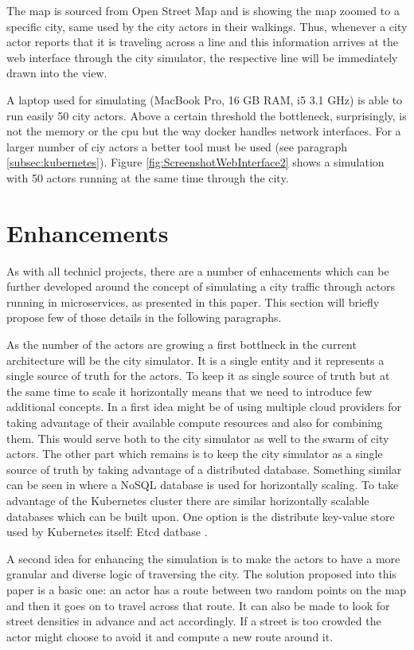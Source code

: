 \documentclass[conference]{IEEEtran}
\begin{document}
The map is sourced from Open Street Map \citep{openstreetmap} and is showing the map zoomed to a specific city, same used by the city actors in their walkings. Thus, whenever a city actor reports that it is traveling across a line and this information arrives at the web interface through the city simulator, the respective line will be immediately drawn into the view.

A laptop used for simulating (MacBook Pro, 16 GB RAM, i5 3.1 GHz) is able to run easily 50 city actors. Above a certain threshold the bottleneck, surprisingly, is not the memory or the cpu but the way docker handles network interfaces. For a larger number of ciy actors a better tool must be used (see paragraph \ref{subsec:kubernetes}). Figure \ref{fig:ScreenshotWebInterface2} shows a simulation with 50 actors running at the same time through the city.

\section{Enhancements}
\label{sec:enhancements}

As with all technicl projects, there are a number of enhacements which can be further developed around the concept of simulating a city traffic through actors running in microservices, as presented in this paper. This section will briefly propose few of those details in the following paragraphs.

As the number of the actors are growing a first bottlneck in the current architecture will be the city simulator. It is a single entity and it represents a single source of truth for the actors. To keep it as single source of truth but at the same time to scale it horizontally means that we need to introduce few additional concepts. In \cite{6847479} a first idea might be of using multiple cloud providers for taking advantage of their available compute resources and also for combining them. This would serve both to the city simulator as well to the swarm of city actors. The other part which remains is to keep the city simulator as a single source of truth by taking advantage of a distributed database. Something similar can be seen in \cite{8509417} where a NoSQL database is used for horizontally scaling. To take advantage of the Kubernetes cluster there are similar horizontally scalable databases which can be built upon. One option is the distribute key-value store used by Kubernetes itself: Etcd datbase \citep{etcd}.

A second idea for enhancing the simulation is to make the actors to have a more granular and diverse logic of traversing the city. The solution proposed into this paper is a basic one: an actor has a route between two random points on the map and then it goes on to travel across that route. It can also be made to look for street densities in advance and act accordingly. If a street is too crowded the actor might choose to avoid it and compute a new route around it.
\end{document}
